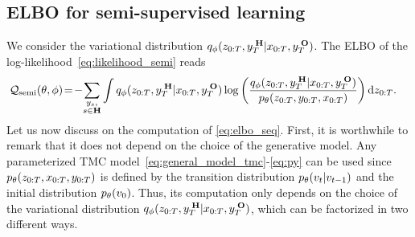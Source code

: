\subsection{ELBO for semi-supervised learning}

We consider the variational distribution 
$q_\phi(z_{0:T}, y_{T}^{\;\mathbf{H}}|x_{0:T}, y_{T}^{\;\mathbf{O}})$. 
The ELBO of the log-likelihood~\eqref{eq:likelihood_semi} reads
\begin{align}
\label{eq:elbo_seq}
\Qsemi(\theta,\phi) \!&=\!  - \! \sum_{\substack{\lab_s, \\ s \in \U} } \int  \q(\latent_{0:T}, \labu|\obs_{0:T}, \labl) %
\log \left(\frac{\q(\latent_{0:T},\labu  |\obs_{0:T},\labl)}{\p(\latent_{0:T}, \lab_{0:T},\obs_{0:T})}\right)  {\rm d} \latent_{0:T} 
\text{.}
\end{align}
Let us now discuss on the 
computation of 
\eqref{eq:elbo_seq}.
First, it is worthwhile to remark 
that it does not depend on the choice of the generative model.
Any parameterized TMC model~\eqref{eq:general_model_tmc}-\eqref{eq:py}
can be used 
since $ p_{\theta}(z_{0:T},x_{0:T}, y_{0:T})$ is 
defined by the transition distribution $p_{\theta}({v}_t| {v}_{t-1})$
and the initial distribution $p_{\theta}({v}_0)$.
Thus, its computation only depends
on the choice of the variational
distribution $q_\phi(z_{0:T}, y_{T}^{\;\mathbf{H}}|x_{0:T}, y_{T}^{\;\mathbf{O}})$, 
which can be factorized in two different ways.

